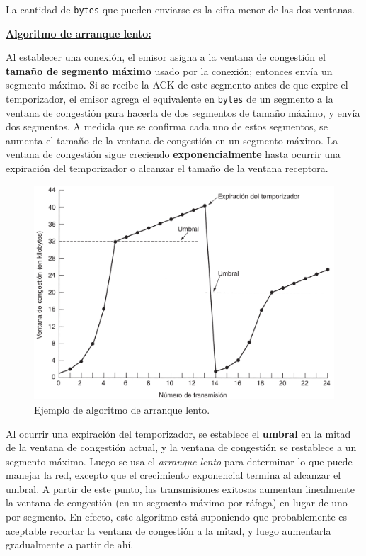 \documentclass[10pt,a4paper]{article}
\begin{document}
La cantidad de \texttt{bytes} que pueden enviarse es la cifra menor de las dos ventanas.

\underline{\textbf{Algoritmo de arranque lento:}}

Al establecer una conexión, el emisor asigna a la ventana de congestión el \textbf{tamaño de segmento máximo} usado por la conexión; entonces envía un segmento máximo. Si se recibe la ACK de este segmento antes de que expire el temporizador, el emisor agrega el equivalente en \texttt{bytes} de un segmento a la ventana de congestión para hacerla de dos segmentos de tamaño máximo, y envía dos segmentos. A medida que se confirma cada uno de estos segmentos, se aumenta el tamaño de la ventana de congestión en un segmento máximo. La ventana de congestión sigue creciendo \textbf{exponencialmente} hasta ocurrir una expiración del temporizador o alcanzar el tamaño de la ventana receptora.

\begin{figure}[ht!]
  \caption{Ejemplo de algoritmo de arranque lento.}
  \label{fig:arranque_lento}
  \centerline{\includegraphics[width=0.85\textwidth-\fboxrule-\fboxrule]{imgs/arranque_lento.png}}
\end{figure}

Al ocurrir una expiración del temporizador, se establece el \textbf{umbral} en la mitad de la ventana de congestión actual, y la ventana de congestión se restablece a un segmento máximo. Luego se usa el \textit{arranque lento} para determinar lo que puede manejar la red, excepto que el crecimiento exponencial termina al alcanzar el umbral. A partir de este punto, las transmisiones exitosas aumentan linealmente la ventana de congestión (en un segmento máximo por ráfaga) en lugar de uno por segmento. En efecto, este algoritmo está suponiendo que probablemente es aceptable recortar la ventana de congestión a la mitad, y luego aumentarla gradualmente a partir de ahí.
\end{document}
